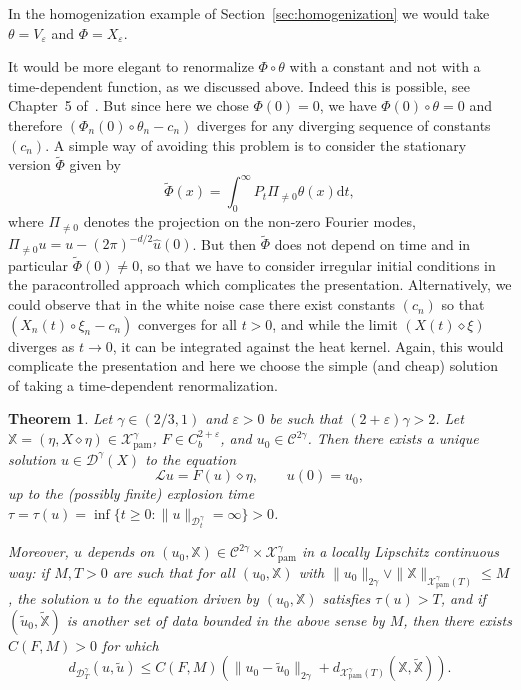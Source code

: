\documentclass[a4paper,11pt]{article}
\newcommand{\mathd}{\mathrm{d}}
\newcommand{\tmop}[1]{\ensuremath{\operatorname{#1}}}
\newtheorem{theorem}{Theorem}
\newcommand{\LL}{\mathscr{L}}
\newcommand{\CC}{\mathscr{C}}
\newcommand{\CD}{\mathscr{D}}
\newcommand{\reso}{\,\mathord{\circ}\,}
\newcommand{\renorm}{\,\mathord{\diamond}\,}
\begin{document}
\begin{remark}
   In the homogenization example of Section~\ref{sec:homogenization} we would take $\theta = V_\varepsilon$ and $\Phi = X_\varepsilon$.
\end{remark}

\begin{remark}
  It would be more elegant to renormalize $\Phi \reso \theta$ with a constant
  and not with a time-dependent function, as we discussed above. Indeed this is possible, see Chapter~5 of~\cite{Gubinelli2012}. But since here we chose $\Phi (0) = 0$,
  we have $\Phi (0) \reso \theta = 0$ and therefore $(\Phi_n (0) \reso
  \theta_n - c_n)$ diverges for any diverging sequence of constants $(c_n)$. A
  simple way of avoiding this problem is to consider the stationary version
  $\tilde{\Phi}$ given by
  \[ \tilde{\Phi} (x) = \int_0^{\infty} P_t \Pi_{\neq 0} \theta (x) \mathd t,
  \]
  where $\Pi_{\neq 0}$ denotes the projection on the non-zero Fourier modes,
  $\Pi_{\neq 0} u = u - (2\pi)^{-d/2}
   \hat{u} (0)$. But then $\tilde{\Phi}$ does not depend
  on time and in particular $\tilde{\Phi} (0) \neq 0$, so that we have to
  consider irregular initial conditions in the paracontrolled approach which
  complicates the presentation. Alternatively, we could observe that in the
  white noise case there exist constants $(c_n)$ so that $(X_n (t) \reso \xi_n
  - c_n)$ converges for all $t > 0$, and while the limit $(X (t) \renorm
  \xi)$ diverges as $t \rightarrow 0$, it can be integrated against the heat
  kernel. Again, this would complicate the presentation and here we choose the
  simple (and cheap) solution of taking a time-dependent renormalization.
\end{remark}

\begin{theorem}
  \label{thm:pam}Let $\gamma \in (2 / 3, 1)$ and $\varepsilon > 0$ be such
  that $(2 + \varepsilon) \gamma > 2$. Let $\mathbb{X}= (\eta, X \diamond \eta) \in
  \mathcal{X}_{\tmop{pam}}^\gamma$, $F \in C^{2 + \varepsilon}_b$, and $u_0 \in
  \CC^{2 \gamma}$. Then there exists a unique solution $u \in \CD^{\gamma}
  (X)$ to the equation
  \[ \LL u = F (u) \renorm \eta, \hspace{2em} u (0) = u_0, \]
  up to the (possibly finite) explosion time $\tau = \tau (u) = \inf \{ t
  \geqslant 0 : \| u \|_{\CD^{\gamma}_t} = \infty \} > 0$.
  
  Moreover, $u$ depends on $(u_0, \mathbb{X}) \in \CC^{2 \gamma} \times
  \mathcal{X}_{\tmop{pam}}^\gamma$ in a locally Lipschitz continuous way: if $M, T >
  0$ are such that for all $(u_0, \mathbb{X})$ with $\| u_0 \|_{2 \gamma}
  \vee \| \mathbb{X} \|_{\mathcal{X}_{\tmop{pam}}^\gamma (T)} \leqslant M$, the
  solution $u$ to the equation driven by $(u_0, \mathbb{X})$ satisfies $\tau
  (u) > T$, and if $(\tilde{u}_0, \tilde{\mathbb{X}})$ is another set of data
  bounded in the above sense by $M$, then there exists $C (F, M) > 0$ for
  which
  \[ d_{\CD^{\gamma}_T} (u, \tilde{u}) \leqslant C (F, M) (\| u_0 -
     \tilde{u}_0 \|_{2 \gamma} + d_{\mathcal{X}_{\tmop{pam}}^\gamma (T)}
     (\mathbb{X}, \tilde{\mathbb{X}})) . \]
\end{theorem}
\end{document}
